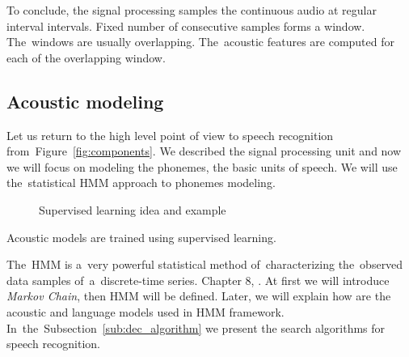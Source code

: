 To conclude, the signal processing samples the continuous audio at regular interval intervals. 
Fixed number of consecutive samples forms a window. The~windows are usually overlapping.
The~acoustic features are computed for each of the overlapping window. 


\subsection{Acoustic modeling}
\label{sub:am}
Let us return to the high level point of view to speech recognition from~Figure~\ref{fig:components}.
We described the signal processing unit and now we will focus on modeling the phonemes, the basic
units of speech. We will use the~statistical \ac{HMM} approach to phonemes modeling.

\begin{figure}[!htp]
    \begin{center}
    
    
    \caption{Supervised learning idea and example}
    \label{fig:supervised} 
    \end{center}
\end{figure}

Acoustic models are trained using supervised learning. 

The~\ac{HMM} is a~very powerful statistical method of~characterizing the~observed data samples 
of~a~discrete-time series. Chapter 8, \cite{huang2001spoken}.
At first we will introduce {\it Markov Chain}, then \ac{HMM} will be defined. Later,  we will explain 
how are the acoustic and language models used in \ac{HMM} framework. 
In~the~Subsection~\ref{sub:dec_algorithm} we present the search algorithms for speech recognition.


% 


